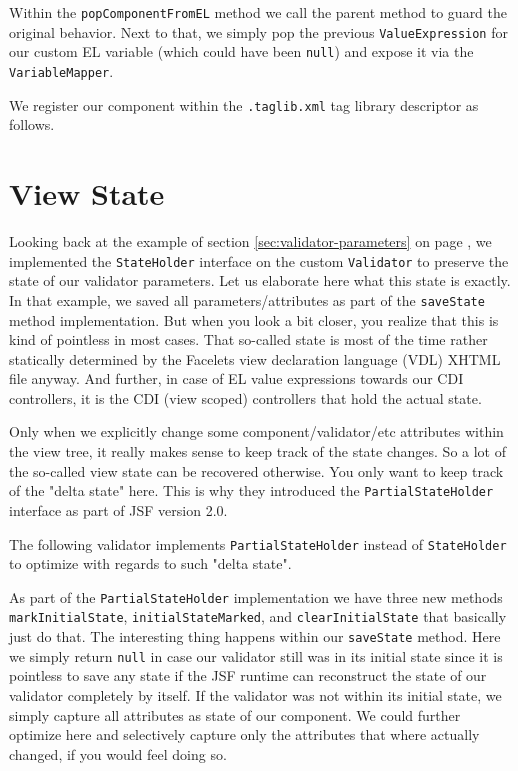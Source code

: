 Within the \texttt{popComponentFromEL} method we call the parent method to guard the original behavior.
Next to that, we simply pop the previous \texttt{ValueExpression} for our custom EL variable (which could have been \texttt{null}) and expose it via the \texttt{VariableMapper}.

We register our component within the \texttt{.taglib.xml} tag library descriptor as follows.


\section{View State}
Looking back at the example of section \ref{sec:validator-parameters}  on page \pageref{sec:validator-parameters},
we implemented the \texttt{StateHolder} interface on the custom \texttt{Validator} to preserve the state of our validator parameters.
Let us elaborate here what this state is exactly.
In that example, we saved all parameters/attributes as part of the \texttt{saveState} method implementation.
But when you look a bit closer, you realize that this is kind of pointless in most cases.
That so-called state is most of the time rather statically determined by the Facelets view declaration language (VDL) XHTML file anyway.
And further, in case of EL value expressions towards our CDI controllers, it is the CDI (view scoped) controllers that hold the actual state.

Only when we explicitly change some component/validator/etc attributes within the view tree, it really makes sense to keep track of the state changes.
So a lot of the so-called view state can be recovered otherwise.
You only want to keep track of the "delta state" here.
This is why they introduced the \texttt{PartialStateHolder} interface as part of JSF version 2.0.

The following validator implements \texttt{PartialStateHolder} instead of \texttt{StateHolder} to optimize with regards to such "delta state".

As part of the \texttt{PartialStateHolder} implementation we have three new methods \texttt{mark\allowbreak InitialState}, \texttt{initialStateMarked}, and \texttt{clearInitialState} that basically just do that.
The interesting thing happens within our \texttt{saveState} method.
Here we simply return \texttt{null} in case our validator still was in its initial state since it is pointless to save any state if the JSF runtime can reconstruct the state of our validator completely by itself.
If the validator was not within its initial state, we simply capture all attributes as state of our component.
We could further optimize here and selectively capture only the attributes that where actually changed, if you would feel doing so.


